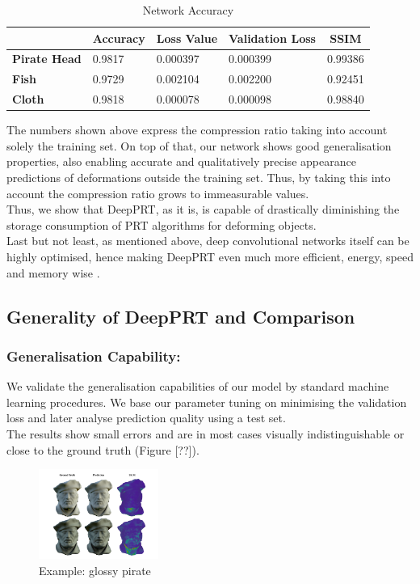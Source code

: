 \begin{table}[]
\begin{tabular}{|l|l|l|l|l|}
\hline
\textbf{}            & \textbf{Accuracy} & \textbf{Loss Value} & \textbf{Validation Loss} & \multicolumn{1}{c|}{\textbf{SSIM}} \\ \hline
\textbf{Pirate Head} & 0.9817            & 0.000397            & 0.000399                 & 0.99386                      \\ \hline
\textbf{Fish}        & 0.9729            & 0.002104            & 0.002200                      &  0.92451                   \\ \hline
\textbf{Cloth}       & 0.9818            & 0.000078            & 0.000098                 & 0.98840                      \\ \hline
\end{tabular}
\caption{Network Accuracy}
\label{Table: NN_Accuracy}
\end{table}
The numbers shown above express the compression ratio taking into account solely the training set. On top of that, our network shows good generalisation properties, also enabling accurate and qualitatively precise appearance predictions of deformations outside the training set. Thus, by taking this into account the compression ratio grows to immeasurable values. 
\\
Thus, we show that DeepPRT, as it is, is capable of drastically diminishing the storage consumption of PRT algorithms for deforming objects. 
\\
Last but not least, as mentioned above, deep convolutional networks itself can be highly optimised, hence making DeepPRT even much more efficient, energy, speed and memory wise \cite{Survey_NN_Compression}. 
\subsection*{Generality of DeepPRT and Comparison}
\subsubsection*{Generalisation Capability:}
We validate the generalisation capabilities of our model by standard machine learning procedures. We base our parameter tuning on minimising the validation loss and later analyse prediction quality using a test set.\\ 
The results show small errors and are in most cases visually indistinguishable or close to the ground truth (Figure [??]). 
\begin{figure}[H]
  \centering
    \includegraphics[width=0.35\textwidth]{Figures/glossy_pirate.pdf}
     \caption{Example: glossy pirate}
     \label{Fig: glossy_pirate}
\end{figure}
